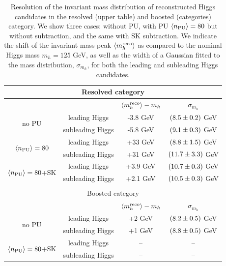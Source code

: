     \begin{table}[h]
      \centering
      \begin{tabular}{|c|c|c|c|}
        \hline
        \multicolumn{4}{|c|}{Resolved category}\\
        \hline
        \hline
        &   &   $\left\langle m_h^{\rm reco}\right\rangle-m_h$  &  $\sigma_{m_h}$  \\
              \hline
        \multirow{2}{*}{no PU}  & leading Higgs  &  -3.8 GeV   & $\left( 8.5\pm 0.2\right)$ GeV   \\
          & subleading Higgs   & -5.8 GeV  &  $\left( 9.1\pm 0.3\right)$ GeV \\
        \hline
          \multirow{2}{*}{$\left\langle n_{\rm PU}\right\rangle=80$}  & leading Higgs  &  +33 GeV   & $\left( 8.8\pm 1.5\right)$ GeV   \\
          & subleading Higgs   & +31 GeV  &  $\left( 11.7\pm 3.3\right)$ GeV \\
          \hline
            \multirow{2}{*}{$\left\langle n_{\rm PU}\right\rangle=80$+SK}  & leading Higgs  &  +3.9 GeV   & $\left( 10.7\pm 0.3\right)$ GeV   \\
          & subleading Higgs   & +2.1 GeV  &  $\left( 10.5\pm 0.3\right)$ GeV \\
            \hline
            \multicolumn{4}{c}{}\\
             \hline
        \multicolumn{4}{|c|}{Boosted category}\\
        \hline
        \hline
        &   &   $\left\langle m_h^{\rm reco}\right\rangle-m_h$  &  $\sigma_{m_h}$  \\
              \hline
        \multirow{2}{*}{no PU}  & leading Higgs  &  +2 GeV   & $\left( 8.2\pm 0.5\right)$ GeV   \\
          & subleading Higgs   & +1 GeV  &  $\left( 8.8\pm 0.5\right)$ GeV \\
        \hline
              \multirow{2}{*}{$\left\langle n_{\rm PU}\right\rangle=80$+SK}  & leading Higgs  &  --   & --   \\
          & subleading Higgs   & --  &  -- \\
        \hline
        \end{tabular}
      \caption{\label{tab:massresolution}
        Resolution of the invariant mass distribution of
        reconstructed Higgs candidates in the resolved (upper table)
        and boosted (categories) category.
        We show three cases: without PU, with PU $\left\langle n_{\rm PU}\right\rangle=80$
        but without subtraction, and the same with SK subtraction.
        We indicate the shift of the invariant mass peak $\left\langle m_h^{\rm reco}\right\rangle$ as compared
        to the nominal Higgs mass $m_h=125$ GeV, as well as the width
        of a Gaussian fitted to the mass distribution, $\sigma_{m_h}$,
        for both the leading and subleading Higgs candidates.
      }
      \end{table}

